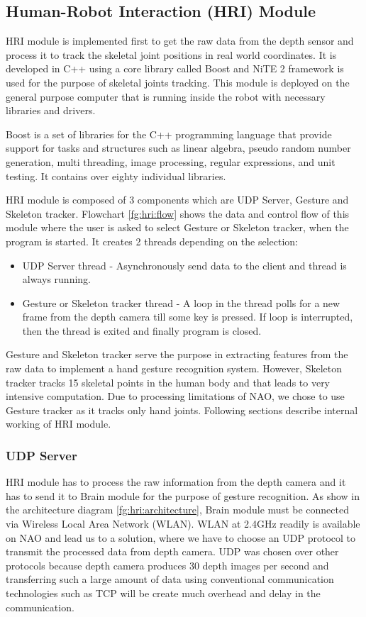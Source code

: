 \subsection{Human-Robot Interaction (HRI) Module} HRI module is implemented first to get the raw data from the depth sensor and process it to track the skeletal joint positions in real world coordinates. It is developed in C++ using a core library called Boost and NiTE 2 framework is used for the purpose of skeletal joints tracking. This module is deployed on the general purpose computer that is running inside the robot with necessary libraries and drivers.

Boost is a set of libraries for the C++ programming language that provide support for tasks and structures such as linear algebra, pseudo random number generation, multi threading, image processing, regular expressions, and unit testing. It contains over eighty individual libraries.

HRI module is composed of 3 components which are UDP Server, Gesture and Skeleton tracker. Flowchart \ref{fg:hri:flow} shows the data and control flow of this module where the user is asked to select Gesture or Skeleton tracker, when the program is started. It creates 2 threads depending on the selection: 

\begin{itemize}
	\item UDP Server thread - Asynchronously send data to the client and thread is always running.
	\item Gesture or Skeleton tracker thread - A loop in the thread polls for a new frame from the depth camera till some key is pressed. If loop is interrupted, then the thread is exited and finally program is closed.

\end{itemize}

Gesture and Skeleton tracker serve the purpose in extracting features from the raw data to implement a hand gesture recognition system. However, Skeleton tracker tracks 15 skeletal points in the human body and that leads to very intensive computation. Due to processing limitations of NAO, we chose to use Gesture tracker as it tracks only hand joints. Following sections describe internal working of HRI module.



\subsubsection{UDP Server}
HRI module has to process the raw information from the depth camera and it has to send it to Brain module for the purpose of gesture recognition. As show in the architecture diagram \ref{fg:hri:architecture}, Brain module must be connected via Wireless Local Area Network (WLAN). WLAN at 2.4GHz readily is available on NAO and lead us to a solution, where we have to choose an UDP protocol to transmit the processed data from depth camera. UDP was chosen over other protocols because depth camera produces 30 depth images per second and transferring such a large amount of data using conventional communication technologies such as TCP will be create much overhead and delay in the communication.

